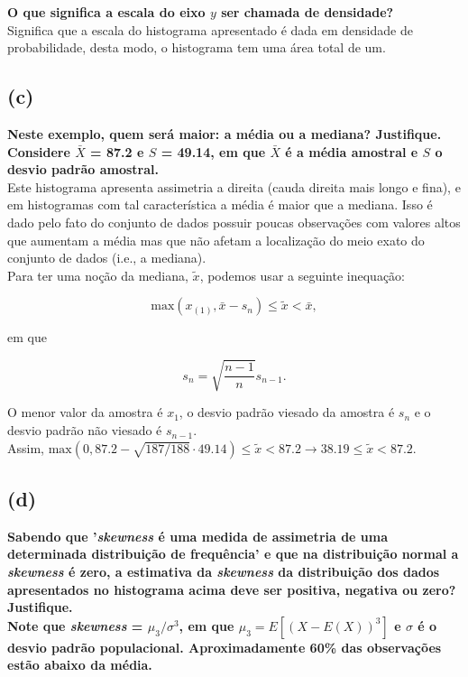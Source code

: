 \documentclass[12pt, oldfontcommands]{article}\usepackage[]{graphicx}\usepackage[]{color}
\begin{document}
\textbf{O que significa a escala do eixo \(y\) ser chamada de
        densidade?} \\
        
\quad
Significa que a escala do histograma apresentado é dada em densidade de
probabilidade, desta modo, o histograma tem uma área total de um.

\subsection*{(c)} 

\textbf{Neste exemplo, quem será maior: a média ou a mediana? 
        Justifique. \\
        Considere \(\bar{X}\) = 87.2 e \(S\) = 49.14, em que \(\bar{X}\) é
        a média amostral e \(S\) o desvio padrão amostral.} \\

\quad
Este histograma apresenta assimetria a direita (cauda direita mais longo e
fina), e em histogramas com tal característica a média é maior que a
mediana. Isso é dado pelo fato do conjunto de dados possuir poucas
observações com valores altos que aumentam a média mas que não afetam a
localização do meio exato do conjunto de dados (i.e., a mediana). \\
     
Para ter uma noção da mediana, \(\tilde{x}\), podemos usar a seguinte
inequação:
       
\[ \text{max}(x_{(1)}, \bar{x} - s_{n}) \leq \tilde{x} < \bar{x}, \]

em que

\[ s_{n} = \sqrt{\frac{n - 1}{n}} s_{n - 1}. \]

O menor valor da amostra é \(x_{1}\), o desvio padrão viesado da amostra é
\(s_{n}\) e o desvio padrão não viesado é \(s_{n - 1}\). \\

Assim, \(\text{max}(0, 87.2 - \sqrt{187/188} \cdot 49.14)
         \leq \tilde{x} <
         87.2 \rightarrow
         38.19
         \leq \tilde{x} < 87.2\).

\subsection*{(d)}             

\textbf{Sabendo que '\textit{skewness} é uma medida de assimetria de uma
        determinada distribuição de frequência' e que na distribuição
        normal a \textit{skewness} é zero, a estimativa da
        \textit{skewness} da distribuição dos dados apresentados no
        histograma acima deve ser positiva, negativa ou zero?
        Justifique. \\
        Note que \textit{skewness} = \(\mu_{3}/\sigma^{3}\), em que
        \(\mu_{3} = E[(X - E(X))^{3}]\) e \(\sigma\) é o desvio padrão
        populacional. Aproximadamente 60\% das observações estão abaixo da
        média.} \\
\end{document}
